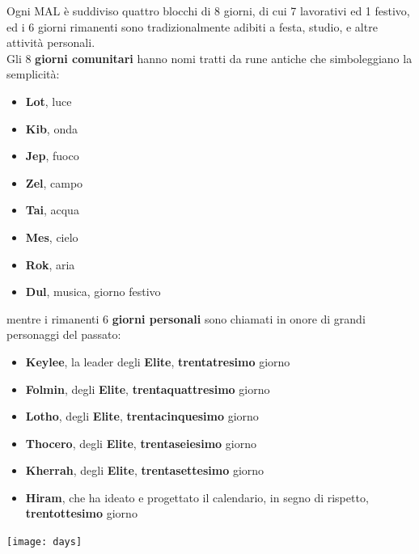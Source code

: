 \documentclass[10pt,twoside,onecolumn,openany]{book}
\begin{document}
Ogni MAL è suddiviso quattro blocchi di 8 giorni, di cui 7 lavorativi ed 1 festivo, ed i 6 giorni rimanenti sono tradizionalmente adibiti a festa, studio, e altre attività personali.\\
Gli 8 \textbf{giorni comunitari} hanno nomi tratti da rune antiche che simboleggiano la semplicità:
\begin{multicols}{2}
\begin{itemize}
\item \textbf{Lot}, luce
\item \textbf{Kib}, onda
\item \textbf{Jep}, fuoco
\item \textbf{Zel}, campo
\item \textbf{Tai}, acqua
\item \textbf{Mes}, cielo
\item \textbf{Rok}, aria
\item \textbf{Dul}, musica, giorno festivo
\end{itemize}
\end{multicols}
mentre i rimanenti 6 \textbf{giorni personali} sono chiamati in onore di grandi personaggi del passato:
\begin{multicols}{2}
\begin{itemize}
\item \textbf{Keylee}, la leader degli \textbf{Elite}, \textbf{trentatresimo} giorno
\item \textbf{Folmin}, degli \textbf{Elite}, \textbf{trentaquattresimo} giorno
\item \textbf{Lotho}, degli \textbf{Elite}, \textbf{trentacinquesimo} giorno
\item \textbf{Thocero}, degli \textbf{Elite}, \textbf{trentaseiesimo} giorno
\item \textbf{Kherrah}, degli \textbf{Elite}, \textbf{trentasettesimo} giorno
\item \textbf{Hiram}, che ha ideato e progettato il calendario, in segno di rispetto, \textbf{trentottesimo} giorno
\end{itemize}
\end{multicols}
\texttt{[image: days]}
\pagebreak
\end{document}
